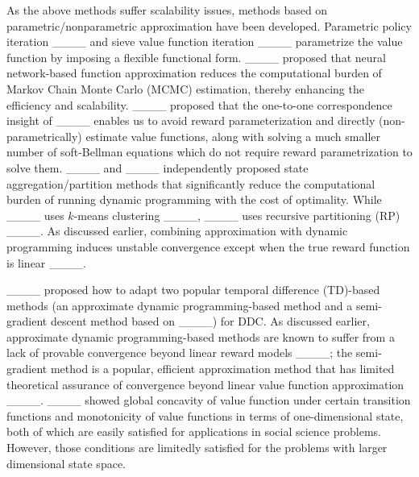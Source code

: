 As the above methods suffer scalability issues, methods based on parametric/nonparametric approximation have been developed. Parametric policy iteration ____ and sieve value function iteration ____ parametrize the value function by imposing a flexible functional form.  ____ proposed that neural network-based function approximation reduces the computational burden of Markov Chain Monte Carlo (MCMC) estimation, thereby enhancing the efficiency and scalability. ____ proposed that the one-to-one correspondence insight of ____ enables us to avoid reward parameterization and directly (non-parametrically) estimate value functions, along with solving a much smaller number of soft-Bellman equations which do not require reward parametrization to solve them. ____ and ____ independently proposed state aggregation/partition methods that significantly reduce the computational burden of running dynamic programming with the cost of optimality. While ____ uses $k$-means clustering ____, ____ uses recursive partitioning (RP) ____. As discussed earlier, combining approximation with dynamic programming induces unstable convergence except when the true reward function is linear ____. 

____ proposed how to adapt two popular temporal difference (TD)-based methods (an approximate dynamic programming-based method and a semi-gradient descent method based on ____) for DDC. As discussed earlier, approximate dynamic programming-based methods are known to suffer from a lack of provable convergence beyond linear reward models ____; the semi-gradient method is a popular, efficient approximation method that has limited theoretical assurance of convergence beyond linear value function approximation ____. ____ showed global concavity of value function under certain transition functions and monotonicity of value functions in terms of one-dimensional state, both of which are easily satisfied for applications in social science problems. However, those conditions are limitedly satisfied for the problems with larger dimensional state space. 

